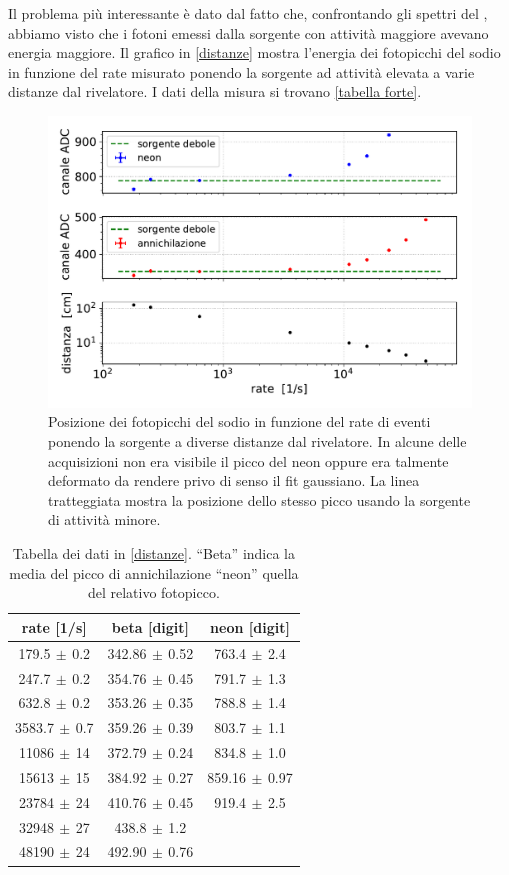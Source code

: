 Il problema più interessante è dato dal fatto che, confrontando gli spettri del \na{}, abbiamo visto che i fotoni emessi dalla sorgente con attività maggiore avevano energia maggiore.
Il grafico in \autoref{distanze} mostra l'energia dei fotopicchi del sodio in funzione del rate misurato ponendo la sorgente ad attività elevata a varie distanze dal rivelatore.
I dati della misura si trovano \autoref{tabella forte}.

\begin{figure}[h]
\centering
\includegraphics[width=28 em]{immagini/naforte}
\caption{Posizione dei fotopicchi del sodio in funzione del rate di eventi ponendo la sorgente a diverse distanze dal rivelatore. In alcune delle acquisizioni non era visibile il picco del neon oppure era talmente deformato da rendere privo di senso il fit gaussiano. La linea tratteggiata mostra la posizione dello stesso picco usando la sorgente di attività minore.}
\label{distanze}
\end{figure}

\begin{table}[h]
\centering
\begin{tabular}{c|c|c}
rate [1/s] & beta [digit] & neon [digit] \\
\hline
 179.5$\,\pm\,$0.2 & 342.86$\,\pm\,$0.52 & 763.4$\,\pm\,$2.4 \\
 247.7$\,\pm\,$0.2 & 354.76$\,\pm\,$0.45 & 791.7$\,\pm\,$1.3 \\
 632.8$\,\pm\,$0.2 & 353.26$\,\pm\,$0.35 & 788.8$\,\pm\,$1.4 \\
3583.7$\,\pm\,$0.7 & 359.26$\,\pm\,$0.39 & 803.7$\,\pm\,$1.1 \\
  11086$\,\pm\,$14 & 372.79$\,\pm\,$0.24 & 834.8$\,\pm\,$1.0 \\
  15613$\,\pm\,$15 & 384.92$\,\pm\,$0.27 & 859.16$\,\pm\,$0.97 \\
  23784$\,\pm\,$24 & 410.76$\,\pm\,$0.45 & 919.4$\,\pm\,$2.5 \\
  32948$\,\pm\,$27 & 438.8$\,\pm\,$1.2 &         \\
  48190$\,\pm\,$24 & 492.90$\,\pm\,$0.76 &        
\end{tabular}

\caption{Tabella dei dati in \autoref{distanze}. ``Beta'' indica la media del picco di annichilazione ``neon'' quella del relativo fotopicco.}
\label{tabella forte}
\end{table}

